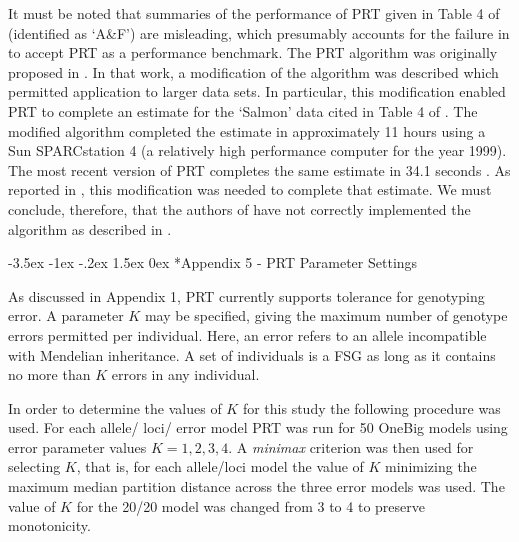 \documentclass[twoside,10pt,twocolumn]{article}
\makeatletter
\renewcommand\section{\@startsection {section}{1}{\z@}%
                                   {-3.5ex \@plus -1ex \@minus -.2ex}%
                                   {1.5ex \@plus 0ex}%
                                   {\normalfont\normalsize\bfseries}}
\makeatother
\begin{document}
It must be noted that summaries of the performance of PRT given in Table 4 of \citet{Chou2012} (identified 
as `A\&F') are misleading, which presumably accounts for the failure in \citet{Chou2012} to accept PRT as a 
performance benchmark. The PRT algorithm was originally proposed in \citet{almudevar99}. In that work, a 
modification of the algorithm was described which permitted application to larger data sets. In particular, 
this modification enabled PRT to complete an estimate for the `Salmon' data cited in Table 4 of 
\citet{Chou2012}. The modified algorithm completed the estimate in approximately 11 hours using a Sun 
SPARCstation 4 (a relatively high performance computer for the year 1999). The most recent version of PRT 
completes the same estimate in 34.1 seconds \citep{alm&and11}. As reported in \citet{almudevar99}, this 
modification was needed to complete that estimate. We must conclude, therefore, that the authors of 
\citet{Chou2012} have not correctly implemented the algorithm as described in \citet{almudevar99}. 

\section*{Appendix 5 - PRT Parameter Settings} 

As discussed in Appendix 1, PRT currently supports tolerance for genotyping error. A parameter $K$ may be 
specified, giving the maximum number of genotype errors permitted per individual. Here, an error refers to 
an allele incompatible with Mendelian inheritance. A set of individuals is a FSG as long as it contains no 
more than $K$ errors in any individual.  

In order to determine the values of $K$ for this study the following procedure was used. For each allele/
loci/  error model PRT was run for 50 OneBig models using error parameter values $K =  1,2,3,4$. A 
\emph{minimax} criterion was then used for selecting $K$, that is, for each allele/loci model the value of 
$K$ minimizing the maximum median partition distance across the three error models was used. The value of $K
$ for the 20/20 model was changed from 3 to 4 to preserve monotonicity. 
\end{document}
